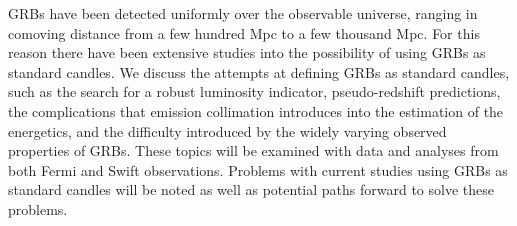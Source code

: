 


\bigskip



\bigskip

\noindent GRBs have been detected uniformly over the observable universe, ranging in comoving distance from a few hundred Mpc to a few thousand Mpc. For this reason there have been extensive studies into the possibility of using GRBs as standard candles. We discuss the attempts at defining GRBs as standard candles, such as the search for a robust luminosity indicator, pseudo-redshift predictions, the complications that emission collimation introduces into the estimation of the energetics, and the difficulty introduced by the widely varying observed properties of GRBs. These topics will be examined with data and analyses from both Fermi and Swift observations. Problems with current studies using GRBs as standard candles will be noted as well as potential paths forward to solve these problems.


